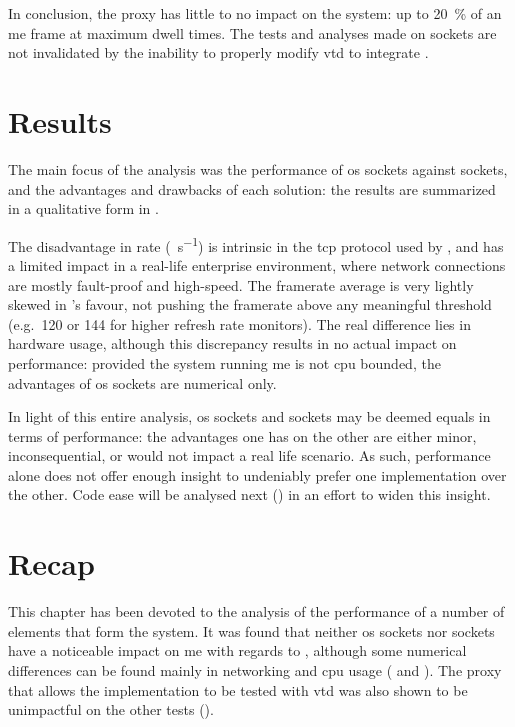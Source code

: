 In conclusion, the \gls{proxy} has little to no impact on the system: up to \SI{20}{\percent} of an \gls{me} frame at maximum dwell times. The tests and analyses made on  sockets are not invalidated by the inability to properly modify \gls{vtd} to integrate .

\section{Results}\label{sc:performance:results}

The main focus of the analysis was the performance of \gls{os} sockets against  sockets, and the advantages and drawbacks of each solution: the results are summarized in a qualitative form in .



The disadvantage in rate (\si{\packets\per\second}) is intrinsic in the \gls{tcp} protocol used by , and has a limited impact in a real-life enterprise environment, where network connections are mostly fault-proof and high-speed. The \gls{framerate} average is very lightly skewed in 's favour, not pushing the \gls{framerate} above any meaningful threshold (e.g.\ \SI{120}{\fps} or \SI{144}{\fps} for higher refresh rate monitors). The real difference lies in hardware usage, although this discrepancy results in no actual impact on performance: provided the system running \gls{me} is not \gls{cpu} bounded, the advantages of \gls{os} sockets are numerical only.

In light of this entire analysis, \gls{os} sockets and  sockets may be deemed equals in terms of performance: the advantages one has on the other are either minor, inconsequential, or would not impact a real life scenario. As such, performance alone does not offer enough insight to undeniably prefer one implementation over the other. Code ease will be analysed next () in an effort to widen this insight.

\section{Recap}\label{sc:performance:recap}

This chapter has been devoted to the analysis of the performance of a number of elements that form the system. It was found that neither \gls{os} sockets nor  sockets have a noticeable impact on \gls{me} with regards to , although some numerical differences can be found mainly in networking and \gls{cpu} usage ( and ). The proxy that allows the  implementation to be tested with \gls{vtd} was also shown to be unimpactful on the other tests ().
